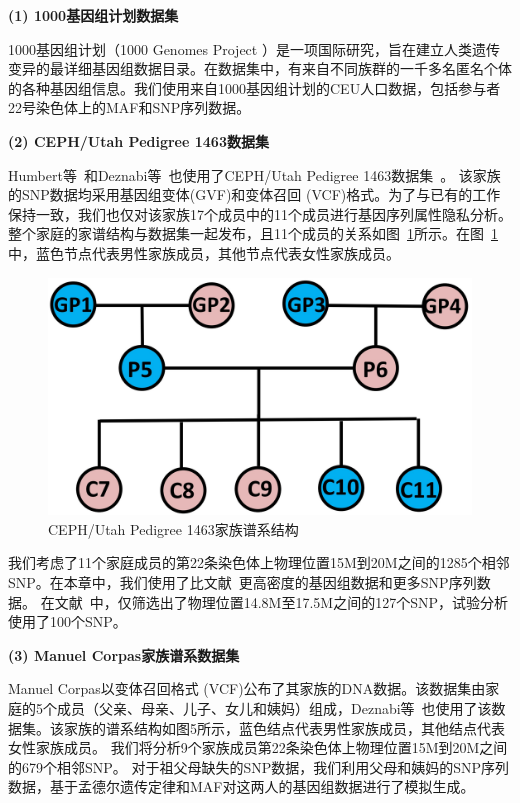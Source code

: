 \textbf{(1) 1000基因组计划数据集}

1000基因组计划（1000 Genomes Project ）是一项国际研究，旨在建立人类遗传变异的最详细基因组数据目录。在数据集中，有来自不同族群的一千多名匿名个体的各种基因组信息。我们使用来自1000基因组计划的CEU人口数据，包括参与者22号染色体上的MAF和SNP序列数据。

\textbf{(2) CEPH/Utah Pedigree 1463数据集}

Humbert等~\cite{humbert2013addressing,humbert2017quantifying}和Deznabi等~\cite{deznabi2018inference}也使用了CEPH/Utah Pedigree 1463数据集~\cite{drmanac2010human}。
该家族的SNP数据均采用基因组变体(GVF)和变体召回 (VCF)格式。为了与已有的工作保持一致，我们也仅对该家族17个成员中的11个成员进行基因序列属性隐私分析。 整个家庭的家谱结构与数据集一起发布，且11个成员的关系如图~\ref{fig:CEPH-Utah-Pedigree}所示。在图~\ref{fig:CEPH-Utah-Pedigree}中，蓝色节点代表男性家族成员，其他节点代表女性家族成员。

\begin{figure}[htbp]
	\centering
	\includegraphics[width=0.6\linewidth]{./figures/CEPH-Utah-Pedigree.jpg}
	\centering
	\caption{CEPH/Utah Pedigree 1463家族谱系结构}\label{fig:CEPH-Utah-Pedigree}
\end{figure}

我们考虑了11个家庭成员的第22条染色体上物理位置15M到20M之间的1285个相邻SNP。在本章中，我们使用了比文献~\cite{deznabi2018inference}更高密度的基因组数据和更多SNP序列数据。 在文献~\cite{deznabi2018inference}中，仅筛选出了物理位置14.8M至17.5M之间的127个SNP，试验分析使用了100个SNP。

\textbf{(3) Manuel Corpas家族谱系数据集}

Manuel Corpas以变体召回格式 (VCF)公布了其家族的DNA数据。该数据集由家庭的5个成员（父亲、母亲、儿子、女儿和姨妈）组成，Deznabi等~\cite{deznabi2018inference}也使用了该数据集。该家族的谱系结构如图5所示，蓝色结点代表男性家族成员，其他结点代表女性家族成员。
我们将分析9个家族成员第22条染色体上物理位置15M到20M之间的679个相邻SNP。 对于祖父母缺失的SNP数据，我们利用父母和姨妈的SNP序列数据，基于孟德尔遗传定律和MAF对这两人的基因组数据进行了模拟生成。


